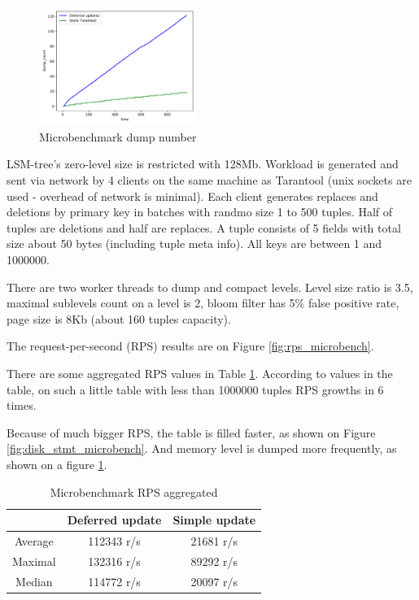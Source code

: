 \documentclass{vldb}
\begin{document}
\begin{figure}
\centering
\includegraphics[width=0.46\textwidth]{dump_count_microbench}
\caption{Microbenchmark dump number}
\label{fig:dump_count_microbench}
\end{figure}

LSM-tree's zero-level size is restricted with 128Mb. Workload is generated and
sent via network by 4 clients on the same machine as Tarantool (unix sockets are
used - overhead of network is minimal). Each client generates replaces and
deletions by primary key in batches with randmo size 1 to 500 tuples. Half of
tuples are deletions and half are replaces. A tuple consists of 5 fields with
total size about 50 bytes (including tuple meta info). All keys are between 1
and 1000000.

There are two worker threads to dump and compact levels. Level size ratio is
3.5, maximal sublevels count on a level is 2, bloom filter has 5\% false
positive rate, page size is 8Kb (about 160 tuples capacity).

The request-per-second (RPS) results are on Figure \ref{fig:rps_microbench}.

There are some aggregated RPS values in Table \ref{table:rps_microbench}.
According to values in the table, on such a little table with less than 1000000
tuples RPS growths in 6 times.

Because of much bigger RPS, the table is filled faster, as shown on Figure
\ref{fig:disk_stmt_microbench}. And memory level is dumped more frequently, as
shown on a figure \ref{fig:dump_count_microbench}.

\begin{table}
\centering
\caption{Microbenchmark RPS aggregated}
\label{table:rps_microbench}
\begin{tabular}{|c|c|c|} \hline
\cellcolor{table_header}&
\cellcolor{table_header}Deferred update &
\cellcolor{table_header}Simple update\\ \hline

\cellcolor{table_header}Average &112343 r/s &21681 r/s\\ \hline
\cellcolor{table_header}Maximal &132316 r/s &89292 r/s\\ \hline
\cellcolor{table_header}Median &114772 r/s &20097 r/s\\
\hline\end{tabular}
\end{table}
\end{document}
